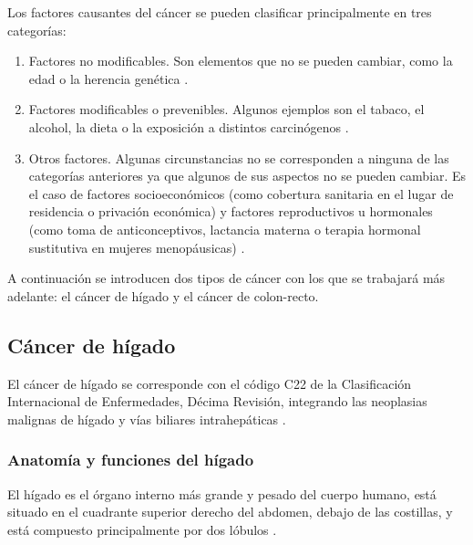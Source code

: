 Los factores causantes del cáncer se pueden clasificar principalmente en tres categorías:
\begin{enumerate}
	\item Factores no modificables. Son elementos que no se pueden cambiar, como la edad o la herencia genética \cite{WorldHealthOrganization2014, WorldHealthOrganization2020}.
	\item Factores modificables o prevenibles. Algunos ejemplos son el tabaco, el alcohol, la dieta o la exposición a distintos carcinógenos \cite{Cogliano2011}.
	\item Otros factores. Algunas circunstancias no se corresponden a ninguna de las categorías anteriores ya que algunos de sus aspectos no se pueden cambiar. Es el caso de  factores socioeconómicos (como cobertura sanitaria en el lugar de residencia o privación económica) y factores reproductivos u hormonales (como toma de anticonceptivos, lactancia materna o terapia hormonal sustitutiva en mujeres menopáusicas) \cite{WorldHealthOrganization2020}.
\end{enumerate}

A continuación se introducen dos tipos de cáncer con los que se trabajará más adelante: el cáncer de hígado y el cáncer de colon-recto.


\subsection{Cáncer de hígado}

El cáncer de hígado se corresponde con el código C22 de la Clasificación Internacional de Enfermedades, Décima Revisión, integrando las neoplasias malignas de hígado y vías biliares intrahepáticas \cite{ICD10, cie10es}.

\subsubsection{Anatomía y funciones del hígado}

El hígado es el órgano interno más grande y pesado del cuerpo humano, está situado en el cuadrante superior derecho del abdomen, debajo de las costillas, y está compuesto principalmente por dos lóbulos \cite{Abdel-Misih2010}.\\

